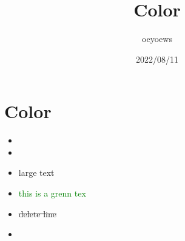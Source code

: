 \documentclass[UTF8]{article}
\title{Color}
\author{oeyoews}
\date{2022/08/11}
\begin{document}
\maketitle

\section{Color}

\begin{itemize}

  \item {}
  \item {}
  \item \huge{large text}
  \item \textcolor{green}{this is a grenn tex}
  \item \sout{delete line}
  \item {}

\end{itemize}
\end{document}
